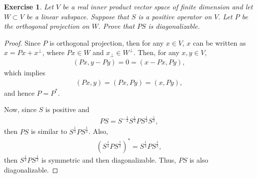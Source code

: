 \documentclass[11pt]{article}
\newtheorem{exercise}{Exercise}[section]
\theoremstyle{definition}
\numberwithin{equation}{subsection}
\begin{document}
\medskip

\begin{exercise}{\rm *}
Let $V$ be a real inner product vector space of finite dimension and let $W \subset V$ be a linear subspace. Suppose that $S$ is a positive operator on $V$. Let $P$ be the orthogonal projection on $W$. Prove that $PS$ is diagonalizable.
\end{exercise}
\begin{proof}
Since $P$ is orthogonal projection, then for any $x \in V$, $x$ can be written as $x = Px + x^\bot$, where $Px \in W$ and $x_\bot \in W^\bot$. Then, for any $x, y \in V$,
\begin{align*}
    (Px, y - Py) = 0 = (x - Px, Py),
\end{align*}
which implies 
\begin{align*}
    (Px, y) = (Px, Py) = (x, Py),
\end{align*}
and hence $P = P^*$.

Now, since $S$ is positive and
\begin{align*}
    PS = S^{-\frac{1}{2}} S^{\frac{1}{2}} P S^{\frac{1}{2}} S^{\frac{1}{2}},
\end{align*}
then $PS$ is similar to $S^{\frac{1}{2}} P S^{\frac{1}{2}}$. Also,
\begin{align*}
    \left(S^{\frac{1}{2}} P S^{\frac{1}{2}} \right)^* = S^{\frac{1}{2}} P S^{\frac{1}{2}},
\end{align*}
then $S^{\frac{1}{2}} P S^{\frac{1}{2}}$ is symmetric and then diagonalizable. Thus, $PS$ is also diagonalizable.
\end{proof}

\medskip
\end{document}
